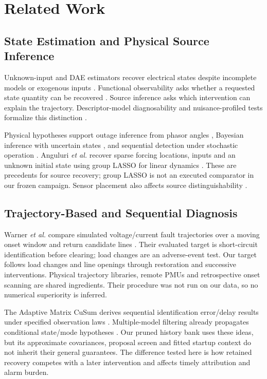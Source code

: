 \section{Related Work}
\label{sec:narrative-related}

\subsection{State Estimation and Physical Source Inference}
Unknown-input and DAE estimators recover electrical states despite
incomplete models or exogenous inputs
\cite{gillijns2007input,nugroho2022dae,katanic2024recursive}. Functional
observability asks whether a requested state quantity can be recovered
\cite{fernando2010functional,montanari2022functional}. Source inference asks
which intervention can explain the trajectory. Descriptor-model
diagnosability and nuisance-profiled tests formalize this distinction
\cite{eriksson2013diagnosability,scharf1994matched}.

Physical hypotheses support outage inference from phasor angles
\cite{tate2008outage}, Bayesian inference with uncertain states
\cite{zhao2014outages}, and sequential detection under stochastic operation
\cite{chen2016quickest,rovatsos2017outage}. Anguluri \emph{et al.} recover
sparse forcing locations, inputs and an unknown initial state using group
LASSO for linear dynamics \cite{anguluri2023group}. These are precedents
for source recovery; group LASSO is not an executed comparator in our
frozen campaign. Sensor placement also affects source distinguishability
\cite{jamei2020limits,conte2023fault,yildiz2025sparse}.

\subsection{Trajectory-Based and Sequential Diagnosis}
Warner \emph{et al.} compare simulated voltage/current fault trajectories
over a moving onset window and return candidate lines
\cite{warner2023highfidelity}. Their evaluated target is short-circuit
identification before clearing; load changes are an adverse-event test.
Our target follows load changes and line openings through restoration and
successive interventions. Physical trajectory libraries, remote PMUs and
retrospective onset scanning are shared ingredients. Their procedure was
not run on our data, so no numerical superiority is inferred.

The Adaptive Matrix CuSum derives sequential identification error/delay
results under specified observation laws \cite{warner2024matrix}.
Multiple-model filtering already propagates conditional state/mode
hypotheses \cite{blom1988imm}. Our pruned history bank uses these ideas,
but its approximate covariances, proposal screen and fitted startup context
do not inherit their general guarantees. The difference tested here is how
retained recovery competes with a later intervention and affects timely
attribution and alarm burden.


